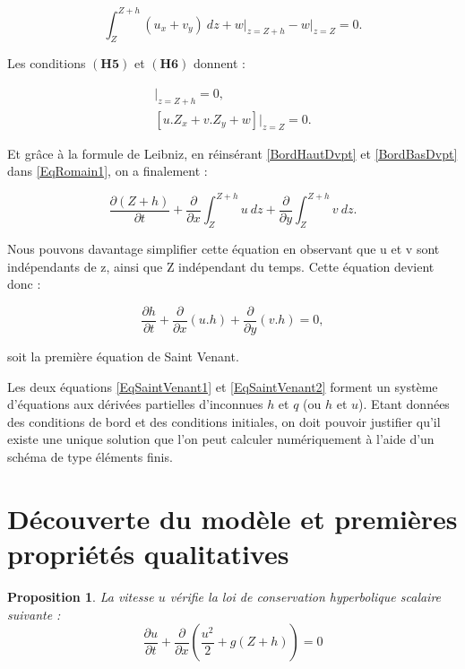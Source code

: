 \documentclass[
11pt, %
francais, %
singlespacing, %
headsepline, %
]{MastersDoctoralThesis} %
\newtheorem{prop}{Proposition}
\theoremstyle{definition}
\begin{document}
\begin{equation}
\int_{Z}^{Z+h} (u_x + v_y) \ dz + w\vert_{z=Z+h}-w\vert_{z=Z} = 0.
\label{EqRomain1}
\end{equation}

Les conditions $(\textbf{H5})$ et  $(\textbf{H6})$ donnent :

\begin{align}
[ \frac{\partial (Z+h)}{\partial t} + u.\frac{\partial (Z+h)}{\partial x} + v.\frac{\partial (Z+h)}{\partial y} - w ] \vert _{z=Z+h} = 0 \label{BordHautDvpt}, \\
[ u.Z_x + v.Z_y + w ] \vert _{z=Z} = 0. \label{BordBasDvpt}
\end{align}

Et grâce à la formule de Leibniz, en réinsérant \ref{BordHautDvpt} et \ref{BordBasDvpt} dans \ref{EqRomain1}, on a finalement : 

\begin{equation}
\frac{\partial (Z+h)}{\partial t} + \frac{\partial}{\partial x} \int_{Z}^{Z+h} u \ dz +  \frac{\partial}{\partial y} \int_{Z}^{Z+h} v \ dz.
\end{equation}

Nous pouvons davantage simplifier cette équation en observant que u et v sont indépendants de z, ainsi que Z indépendant du temps. Cette équation devient donc :

\begin{equation}
\frac{\partial h}{\partial t} + \frac{\partial}{\partial x} (u . h ) + \frac{\partial}{\partial y} (v . h )=0,\label{EqSaintVenant1}
\end{equation}

soit la première équation de Saint Venant.

Les deux équations \ref{EqSaintVenant1} et \ref{EqSaintVenant2} forment un système d'équations aux dérivées partielles d'inconnues $h$ et $q$ (ou $h$ et $u$). Etant données des conditions de bord et des conditions initiales, on doit pouvoir justifier qu'il existe une unique solution que l'on peut calculer numériquement à l'aide d'un schéma de type éléments finis.

\section{Découverte du modèle et premières propriétés qualitatives}

\begin{prop} La vitesse $u$ vérifie la loi de conservation hyperbolique scalaire suivante : 
\begin{equation}
\frac{\partial u}{\partial t}+\frac{\partial}{\partial x}(\frac{u^{2}}{2}+g(Z+h))=0 \label{cl}
\end{equation}

\end{prop}
\end{document}
